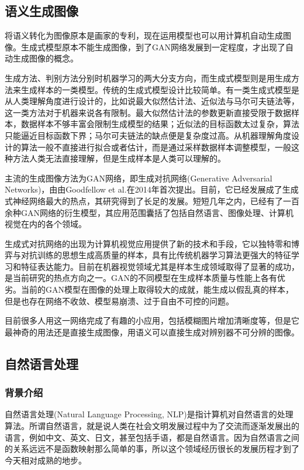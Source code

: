\subsection{语义生成图像}
将语义转化为图像原本是画家的专利，现在运用模型也可以用计算机自动生成图像。生成式模型原本不能生成图像，到了GAN网络发展到一定程度，才出现了自动生成图像的概念。

生成方法、判别方法分别时机器学习的两大分支方向，而生成式模型则是用生成方法来生成样本的一类模型。传统的生成式模型设计比较简单。有一类生成式模型是从人类理解角度进行设计的，比如说最大似然估计法、近似法与马尔可夫链法等，这一类方法对于机器来说各有限制。最大似然估计法的参数更新直接受限于数据样本，数据样本不够丰富会限制生成模型的结果；近似法的目标函数太过复杂，算法只能逼近目标函数下界；马尔可夫链法的缺点便是复杂度过高。从机器理解角度设计的算法一般不直接进行拟合或者估计，而是通过采样数据样本调整模型，一般这种方法人类无法直接理解，但是生成样本是人类可以理解的。

主流的生成图像方法为GAN网络，即生成对抗网络(Generative Adversarial Networks)，由由Goodfellow et al.在2014年首次提出。目前，它已经发展成了生成式神经网络最大的热点，其研究得到了长足的发展。短短几年之内，已经有了一百余种GAN网络的衍生模型，其应用范围囊括了包括自然语言、图像处理、计算机视觉在内的各个领域。

生成式对抗网络的出现为计算机视觉应用提供了新的技术和手段，它以独特零和博弈与对抗训练的思想生成高质量的样本，具有比传统机器学习算法更强大的特征学习和特征表达能力。目前在机器视觉领域尤其是样本生成领域取得了显著的成功，是当前研究的热点方向之一。GAN的不同模型在生成样本质量与性能上各有优劣。当前的GAN模型在图像的处理上取得较大的成就，能生成以假乱真的样本，但是也存在网络不收敛、模型易崩溃、过于自由不可控的问题。

目前很多人用这一网络完成了有趣的小应用，包括模糊图片增加清晰度等，但是它最神奇的用法还是直接生成图像，用语义可以直接生成对辨别器不可分辨的图像。

\subsection{自然语言处理}
\subsubsection{背景介绍}
自然语言处理(Natural Language Processing, NLP)是指计算机对自然语言的处理算法。所谓自然语言，就是说人类在社会文明发展过程中为了交流而逐渐发展出的语言，例如中文、英文、日文，甚至包括手语，都是自然语言。因为自然语言之间的关系远远不是函数映射那么简单的事，所以这个领域经历很长的发展历程才到了今天相对成熟的地步。

